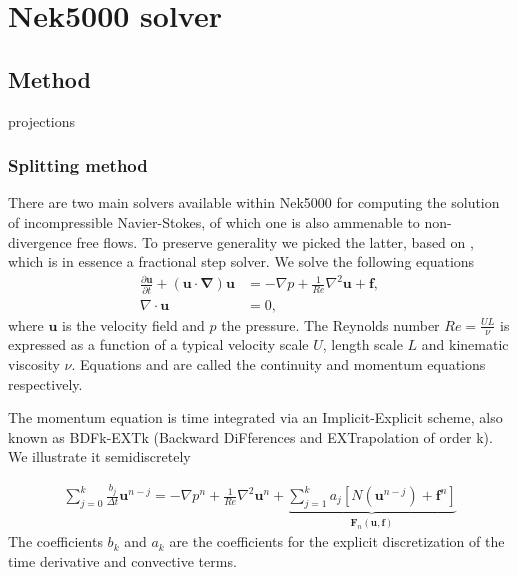 \documentclass{sig-alternate}
\begin{document}



\section{Nek5000 solver}

\subsection{Method}
projections

\subsubsection{Splitting method}
There are two main solvers available within Nek5000 for computing the solution of incompressible Navier-Stokes, of which one is also ammenable to non-divergence free flows. To preserve generality we picked the latter, based on \cite{Tomboulides1997}, which is in essence a fractional step solver. We solve the following equations
\begin{align}
 \frac{\partial \mathbf{u}}{\partial t} + (\mathbf{u \cdot \nabla}) \mathbf{u} & = - \nabla p + \frac{1}{Re} \nabla^2 \mathbf{u} + \mathbf{f} \label{eqn:NS_momentum},\\
 \nabla \cdot \mathbf{u} & = 0, \label{eqn:NS_continuity}
\end{align}
where $\mathbf{u}$ is the velocity field and $p$ the pressure. The Reynolds number $Re = \frac{U L}{\nu}$ is expressed as a function of a typical velocity scale $U$, length scale $L$ and kinematic viscosity $\nu$. Equations   and  are called the continuity and momentum equations respectively. 

The momentum equation is time integrated via an Implicit-Explicit scheme, also known as BDFk-EXTk (Backward DiFferences and EXTrapolation of order k). We illustrate it semidiscretely

\begin{eqnarray}
\sum\limits_{j=0}^k \frac{b_j}{\Delta t} \mathbf u^{n-j}  = - \nabla p^{n}+\frac{1}{Re}\nabla^2\mathbf u^{n}+\underbrace{\sum\limits_{j=1}^k a_j [N(\mathbf u^{n-j})+\mathbf f^{n}]}_{\mathbf{F}_n(\mathbf u,\mathbf f)}\label{eqn:discrete}
\end{eqnarray}
The coefficients $b_k$ and $a_k$ are the coefficients for the explicit discretization of the time derivative and convective terms.
\end{document}
